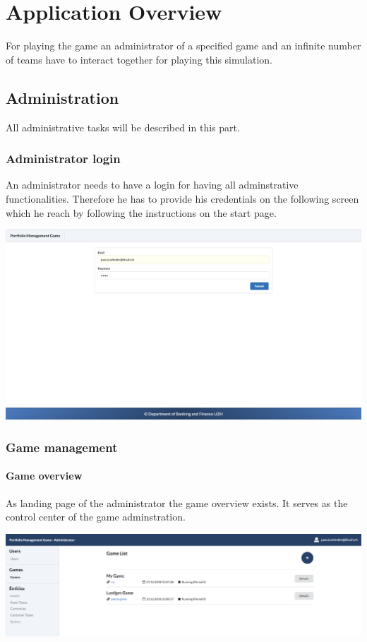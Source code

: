 \section{Application Overview}
For playing the game an administrator of a specified game and an infinite number of teams have to interact together for playing this simulation.

\subsection{Administration}
All administrative tasks will be described in this part.

\subsubsection{Administrator login}
An administrator needs to have a login for having all adminstrative functionalities. Therefore he has to provide his credentials on the following screen which he reach by following the instructions on the start page.
\begin{center}
  \includegraphics[scale=0.2]{img/application-overview/administrator/login.png}
\end{center}

\subsubsection{Game management}
\paragraph{Game overview}
As landing page of the administrator the game overview exists. It serves as the control center of the game adminstration.
\begin{center}
  \includegraphics[scale=0.2]{img/application-overview/administrator/game_overview.png}
\end{center}

